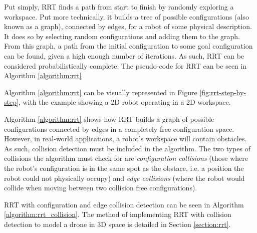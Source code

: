         Put simply, \gls{RRT} finds a path from start to finish by randomly exploring a workspace.
        Put more technically, it builds a tree of possible \glspl{configuration} (also known as a graph), connected by edges, for a robot of some physical description. It does so by selecting random \glspl{configuration} and adding them to the graph. 
        From this graph, a path from the initial \gls{configuration} to some goal \gls{configuration} can be found, given a high enough number of iterations. As such, \gls{RRT} can be considered \gls{probabilistically complete}.
        The pseudo-code for \gls{RRT} can be seen in Algorithm \ref{algorithm:rrt}
        
        

        Algorithm \ref{algorithm:rrt} can be visually represented in Figure \ref{fig:rrt-step-by-step}, with the example showing a \gls{2D} robot operating in a \gls{2D} workspace.

        

        \newpage

        Algorithm \ref{algorithm:rrt} shows how \gls{RRT} builds a graph of possible \gls{configuration}s connected by edges in a completely free \gls{configuration} space. However, in real-world applications, a robot's \gls{workspace} will contain obstacles. As such, collision detection must be included in the algorithm. The two types of collisions the algorithm must check for are \textit{configuration collisions} (those where the robot's configuration is in the same spot as the obstace, i.e. a position the robot could not physically occupy) and \textit{edge collisions} (where the robot would collide when moving between two collision free \glspl{configuration}).

        \gls{RRT} with \gls{configuration} and edge collision detection can be seen in Algorithm \ref{algorithm:rrt_collision}. The method of implementing \gls{RRT} with collision detection to model a drone in 3D space is detailed in Section \ref{section:rrt}.

        
